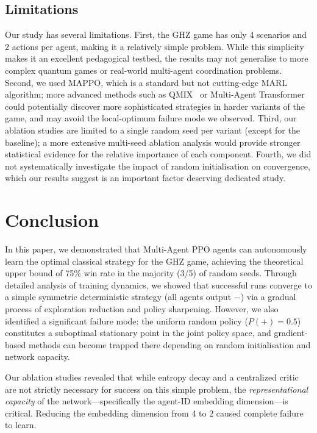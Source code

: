 \documentclass[conference]{IEEEtran}
\begin{document}
\subsection{Limitations}

Our study has several limitations. First, the GHZ game has only 4 scenarios and 2 actions per agent, making it a relatively simple problem. While this simplicity makes it an excellent pedagogical testbed, the results may not generalise to more complex quantum games or real-world multi-agent coordination problems. Second, we used MAPPO, which is a standard but not cutting-edge MARL algorithm; more advanced methods such as QMIX~\cite{rashid2018qmix} or Multi-Agent Transformer~\cite{wen2022mat} could potentially discover more sophisticated strategies in harder variants of the game, and may avoid the local-optimum failure mode we observed. Third, our ablation studies are limited to a single random seed per variant (except for the baseline); a more extensive multi-seed ablation analysis would provide stronger statistical evidence for the relative importance of each component. Fourth, we did not systematically investigate the impact of random initialisation on convergence, which our results suggest is an important factor deserving dedicated study.

\section{Conclusion}

In this paper, we demonstrated that Multi-Agent PPO agents can autonomously learn the optimal classical strategy for the GHZ game, achieving the theoretical upper bound of 75\% win rate in the majority (3/5) of random seeds. Through detailed analysis of training dynamics, we showed that successful runs converge to a simple symmetric deterministic strategy (all agents output $-$) via a gradual process of exploration reduction and policy sharpening. However, we also identified a significant failure mode: the uniform random policy ($P(+)=0.5$) constitutes a suboptimal stationary point in the joint policy space, and gradient-based methods can become trapped there depending on random initialisation and network capacity.

Our ablation studies revealed that while entropy decay and a centralized critic are not strictly necessary for success on this simple problem, the \emph{representational capacity} of the network---specifically the agent-ID embedding dimension---is critical. Reducing the embedding dimension from 4 to 2 caused complete failure to learn.
\end{document}
